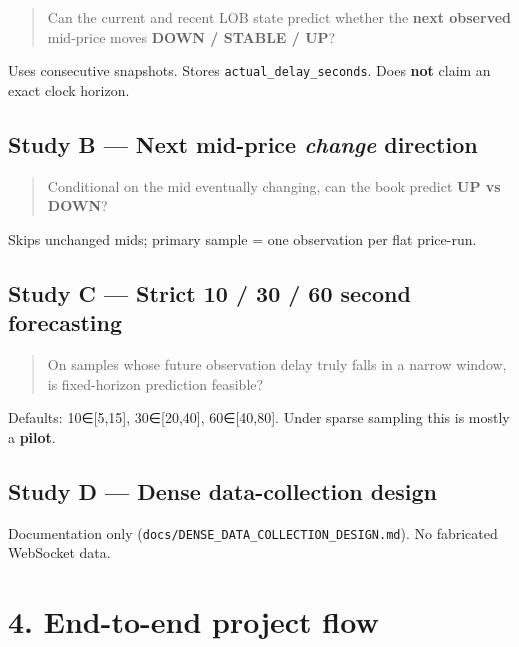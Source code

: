 \documentclass[11pt,a4paper]{article}
\begin{document}
\begin{quote}
Can the current and recent LOB state predict whether the \textbf{next observed} mid-price moves \textbf{DOWN / STABLE / UP}?
\end{quote}

Uses consecutive snapshots. Stores \texttt{actual\_delay\_seconds}. Does \textbf{not} claim an exact clock horizon.


\subsection{Study B --- Next mid-price \textit{change} direction}

\begin{quote}
Conditional on the mid eventually changing, can the book predict \textbf{UP vs DOWN}?
\end{quote}

Skips unchanged mids; primary sample = one observation per flat price-run.


\subsection{Study C --- Strict 10 / 30 / 60 second forecasting}

\begin{quote}
On samples whose future observation delay truly falls in a narrow window, is fixed-horizon prediction feasible?
\end{quote}

Defaults: 10∈[5,15], 30∈[20,40], 60∈[40,80]. Under sparse sampling this is mostly a \textbf{pilot}.


\subsection{Study D --- Dense data-collection design}

Documentation only (\texttt{docs/DENSE\_DATA\_COLLECTION\_DESIGN.md}). No fabricated WebSocket data.


\vspace{0.5em}

\section{4. End-to-end project flow}
\end{document}
